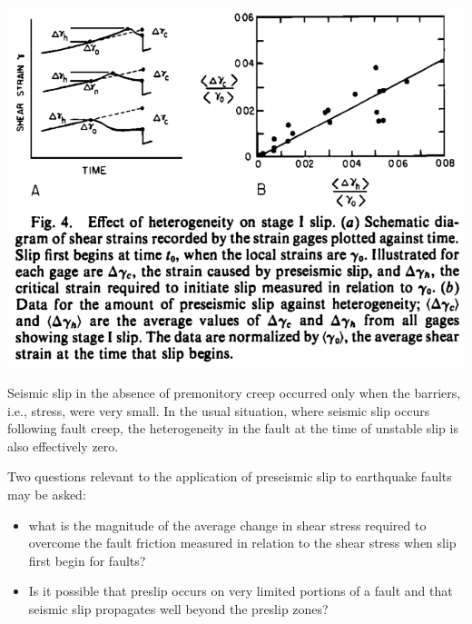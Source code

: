 \documentclass[aspectratio=43,9pt]{beamer}
\begin{document}
\begin{frame}{}

\begin{center}
\includegraphics[width=0.7\linewidth]{Figs/figure_4.jpg} 
\end{center}



Seismic slip in the absence of premonitory creep occurred only 
when the barriers, i.e., stress, were very small. 
In the usual situation, where seismic slip occurs following fault creep, 
the heterogeneity in the fault at the time of unstable slip is also effectively zero.

\end{frame}



\begin{frame}
 
Two questions relevant to the application of
preseismic slip to earthquake faults may be asked:

\begin{itemize}
 \item what is the magnitude of the average change in shear stress required to 
overcome the fault friction measured in relation to the shear stress when 
slip first begin for faults? 
 \item Is it possible that preslip occurs on very limited portions of a fault and that
seismic slip propagates well beyond the preslip zones?
\end{itemize}



\end{frame}
\end{document}
